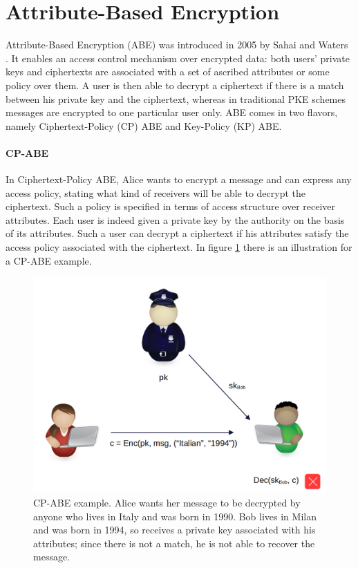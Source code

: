 \section{Attribute-Based Encryption}

Attribute-Based Encryption (ABE) was introduced in 2005 by Sahai and Waters \cite{Sahai}.
It enables an access control mechanism over encrypted data: both users’ private keys and ciphertexts are associated with a set of ascribed attributes or some policy over them.
A user is then able to decrypt a ciphertext if there is a match between his private key and the ciphertext, whereas in traditional PKE schemes messages are encrypted to one particular user only.
\newline\newline
ABE comes in two flavors, namely Ciphertext-Policy (CP) ABE and Key-Policy (KP) ABE.

\paragraph*{CP-ABE}
In Ciphertext-Policy ABE, Alice wants to encrypt a message and can express any access policy, stating what kind of receivers will be able to decrypt the ciphertext.
Such a policy is specified in terms of access structure over receiver attributes.
Each user is indeed given a private key by the authority on the basis of its attributes.
Such a user can decrypt a ciphertext if his attributes satisfy the access policy associated with the ciphertext.
In figure \ref{fig:cp_abe_example} there is an illustration for a CP-ABE example.
\begin{figure}[ht]
    \centering
    \includegraphics[width=0.8\linewidth]{images/cp_abe.png}
    \caption{CP-ABE example. Alice wants her message to be decrypted by anyone who lives in Italy and was born in 1990. Bob lives in Milan and was born in 1994, so receives a private key associated with his attributes; since there is not a match, he is not able to recover the message.}
    \label{fig:cp_abe_example}
\end{figure}

